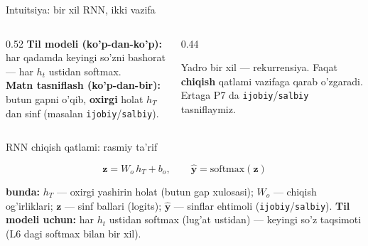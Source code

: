 \documentclass[aspectratio=169,11pt]{beamer}
\newcommand{\bunda}[1]{{\small\textbf{bunda:}\; #1}}
\begin{document}
\begin{frame}{Intuitsiya: bir xil RNN, ikki vazifa}
  \begin{columns}[T]
    \begin{column}{0.52\textwidth}
      \small
      \textbf{Til modeli (ko'p-dan-ko'p):} har qadamda keyingi so'zni bashorat ---
      har $h_t$ ustidan softmax.\\[6pt]
      \textbf{Matn tasniflash (ko'p-dan-bir):} butun gapni o'qib, \textbf{oxirgi}
      holat $h_T$ dan sinf (masalan \texttt{ijobiy}/\texttt{salbiy}).
    \end{column}
    \begin{column}{0.44\textwidth}
      \begin{tcolorbox}[okbox,top=2pt,bottom=2pt]
        \footnotesize
        Yadro bir xil --- rekurrensiya. Faqat \textbf{chiqish} qatlami vazifaga
        qarab o'zgaradi. Ertaga P7 da \texttt{ijobiy}/\texttt{salbiy} tasniflaymiz.
      \end{tcolorbox}
    \end{column}
  \end{columns}
\end{frame}

\begin{frame}{RNN chiqish qatlami: rasmiy ta'rif}
  \begin{tcolorbox}[defbox,title=Ta'rif: ko'p-dan-bir tasniflash boshi]
    \vspace{-0.4em}
    $$ \mathbf{z} = W_o\,h_T + b_o, \qquad
       \hat{\mathbf{y}} = \mathrm{softmax}(\mathbf{z}) $$
  \end{tcolorbox}
  \vspace{2pt}
  \bunda{$h_T$ --- oxirgi yashirin holat (butun gap xulosasi); $W_o$ ---
  chiqish og'irliklari; $\mathbf{z}$ --- sinf ballari (logits); $\hat{\mathbf{y}}$
  --- sinflar ehtimoli (\texttt{ijobiy}/\texttt{salbiy}).}
  \vspace{4pt}
  \textbf{Til modeli uchun:} har $h_t$ ustidan softmax (lug'at ustidan) --- keyingi
  so'z taqsimoti (L6 dagi softmax bilan bir xil).
\end{frame}
\end{document}
